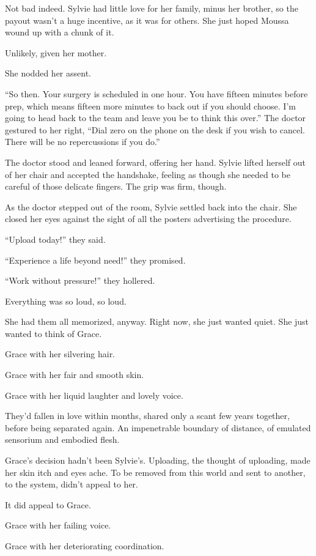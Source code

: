 Not bad indeed. Sylvie had little love for her family, minus her brother, so the payout wasn't a huge incentive, as it was for others. She just hoped Moussa wound up with a chunk of it.

Unlikely, given her mother.

She nodded her assent.

``So then. Your surgery is scheduled in one hour. You have fifteen minutes before prep, which means fifteen more minutes to back out if you should choose. I'm going to head back to the team and leave you be to think this over.'' The doctor gestured to her right, ``Dial zero on the phone on the desk if you wish to cancel. There will be no repercussions if you do.''

The doctor stood and leaned forward, offering her hand. Sylvie lifted herself out of her chair and accepted the handshake, feeling as though she needed to be careful of those delicate fingers. The grip was firm, though.

As the doctor stepped out of the room, Sylvie settled back into the chair. She closed her eyes against the sight of all the posters advertising the procedure.

``Upload today!'' they said.

``Experience a life beyond need!'' they promised.

``Work without pressure!'' they hollered.

Everything was so loud, so loud.

She had them all memorized, anyway. Right now, she just wanted quiet. She just wanted to think of Grace.

Grace with her silvering hair.

Grace with her fair and smooth skin.

Grace with her liquid laughter and lovely voice.

They'd fallen in love within months, shared only a scant few years together, before being separated again. An impenetrable boundary of distance, of emulated sensorium and embodied flesh.

Grace's decision hadn't been Sylvie's. Uploading, the thought of uploading, made her skin itch and eyes ache. To be removed from this world and sent to another, to the system, didn't appeal to her.

It did appeal to Grace.

Grace with her failing voice.

Grace with her deteriorating coordination.

